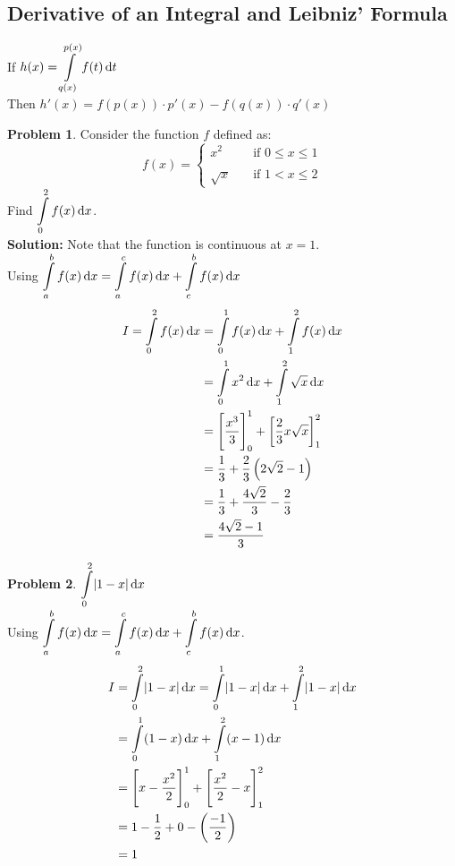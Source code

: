 \documentclass[14]{article}
\theoremstyle{definition}
\newtheorem{prob}{Problem}
\theoremstyle{case}
\begin{document}
\subsection{Derivative of an Integral and Leibniz' Formula}
If $h(x) = \displaystyle \int\limits_{q(x)}^{p(x)}f(t) \dif t$\\
Then $h'(x) = f \left(p\left(x\right)\right) \cdot p'(x) - f \left(q\left(x\right)\right) \cdot q'(x)$
\pagebreak
\begin{prob}
Consider the function $f$ defined as:
\[
f\left(x\right) = \left\{
        \begin{array}{ll}
            x^2 & \quad \text{if } 0 \leq x \leq 1  \\\\
            \sqrt{x} & \quad \text{if } 1 < x \leq 2
        \end{array}
    \right.
\]
Find $\displaystyle \int \limits_0^2 f(x) \dif x$.\\
\textbf{Solution:} Note that the function is continuous at $x=1$.\\
Using  $\displaystyle \int\limits_a^b f(x) \dif x = \displaystyle \int\limits_a^c f(x) \dif x + \displaystyle \int\limits_c^b f(x) \dif x$
\begin{align*}
I = \int\limits_0^2 f(x) \dif x &= \int\limits_0^1 f(x) \dif x + \int \limits_1^2 f(x) \dif x\\
&= \int\limits_0^1 x^2 \dif x + \int\limits_1^2 \sqrt{x} \dif x\\
&= \left[ \dfrac{x^3}3 \right]_0^1 + \left[ \dfrac23 x\sqrt{x} 
\right]_1^2\\
&= \dfrac13 + \dfrac23 \left(2\sqrt2 - 1 \right)\\
&= \dfrac13 + \dfrac{4\sqrt2}3 - \dfrac23\\
&= \dfrac{4\sqrt2 - 1}{3}
\end{align*}
\end{prob}
\begin{prob}
$\displaystyle \int\limits_0^2 \abs{1-x} \dif x$\\
Using $\displaystyle \int\limits_a^b f(x) \dif x = \displaystyle \int\limits_a^c f(x) \dif x + \displaystyle \int\limits_c^b f(x) \dif x$.
\begin{align*}
I &= \int\limits_0^2 \abs{1-x} \dif x = \int\limits_0^1 \abs{1-x} \dif x + \int\limits_1^2 \abs{1-x} \dif x\\
&= \int\limits_0^1 (1-x) \dif x + \int\limits_1^2 (x-1) \dif x\\
&= \left[ x - \dfrac{x^2}{2} \right]_0^1 + \left[ \dfrac{x^2}{2} - x \right]_1^2\\
&= 1 - \dfrac12 + 0 - \left( \dfrac{-1}2 \right) \\
&= 1
\end{align*}
\end{prob}
\pagebreak
\end{document}
